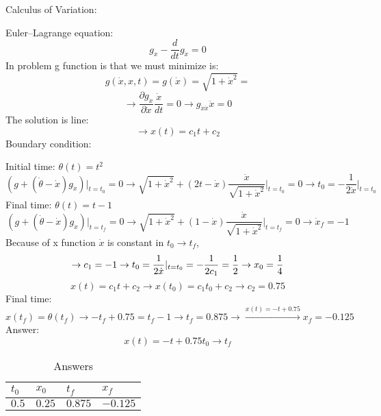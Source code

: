 Calculus of Variation:


Euler–Lagrange equation:
$$g_x - \dfrac{d}{dt}g_{\dot{x}} = 0$$
In problem g function is that we must minimize is:
$$g(\dot{x}, x, t) = g(\dot{x}) = \sqrt{1+\dot{x}^2} = $$
$$\to \dfrac{\partial g_{\dot{x}}}{\partial \dot{x}} \dfrac{\dot{x}}{dt} = 0 \to g_{\dot{x}\dot{x}}\ddot{x} = 0 $$
The solution is line:
$$\to x(t) = c_1t+ c_2$$
Boundary condition:



Initial time: 
$\theta(t) = t^2 $
$$(g + (\dot{\theta}-\dot{x})g_{\dot{x}}) \vert_{t = t_0}= 0 \to \sqrt{1+\dot{x}^2} + (2t -\dot{x} )\dfrac{\dot{x}}{\sqrt{1+\dot{x}^2}}\vert_{t = t_0} = 0 \to t_0 = -\dfrac{1}{2\dot{x}}\vert_{t = t_0}$$
Final time: 
$\theta(t) = t-1 $
$$(g + (\dot{\theta}-\dot{x})g_{\dot{x}})\vert_{t = t_f}  = 0 \to \sqrt{1+\dot{x}^2} + (1-\dot{x}) \dfrac{\dot{x}}{\sqrt{1+\dot{x}^2}}\vert_{t = t_f} = 0 \to \dot{x}_f = -1$$
Because of x function $\dot{x}$ is constant in $t_0 \to t_f$,
$$\to c_1 = -1\\
\to t_0 = \dfrac{1}{2\dot{x}}\vert_{t = t_0} =-\dfrac{1}{2c_1} = \dfrac12 \to x_0 = \frac14 $$ 
$$x(t) = c_1t+c_2 \to x(t_0) = c_1t_0 + c_2 \to c_2 = 0.75$$
Final time:
$$x(t_f) = \theta(t_f) \to -t_f + 0.75 = t_f-1 \to t_f = 0.875 \to \xrightarrow{x(t) = -t+0.75} x_f = -0.125$$
Answer:
$$x(t) = -t+0.75 t_0 \to t_f$$

\begin{table}[H]
	\caption {Answers} \label{ans} 
	\begin{center}
		\begin{tabular}{| l | l | l | l |}
			\hline
			$t_0$ & $x_0$ & $t_f$ & $x_f$ \TBstrut \\
			\hline
			$0.5$ & $0.25$ & $0.875$ & $-0.125$ \Tstrut\\
			\hline
		\end{tabular}
	\end{center}
\end{table}
